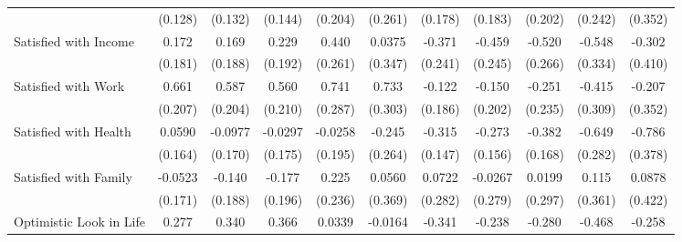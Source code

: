 {\begin{tabular}{l*{10}{c}}
            &     (0.128)         &     (0.132)         &     (0.144)         &     (0.204)         &     (0.261)         &     (0.178)         &     (0.183)         &     (0.202)         &     (0.242)         &     (0.352)         \\
\addlinespace
Satisfied with Income&       0.172         &       0.169         &       0.229         &       0.440         &      0.0375         &      -0.371         &      -0.459         &      -0.520         &      -0.548         &      -0.302         \\
            &     (0.181)         &     (0.188)         &     (0.192)         &     (0.261)         &     (0.347)         &     (0.241)         &     (0.245)         &     (0.266)         &     (0.334)         &     (0.410)         \\
\addlinespace
Satisfied with Work&       0.661\sym{**} &       0.587\sym{**} &       0.560\sym{**} &       0.741\sym{**} &       0.733\sym{*}  &      -0.122         &      -0.150         &      -0.251         &      -0.415         &      -0.207         \\
            &     (0.207)         &     (0.204)         &     (0.210)         &     (0.287)         &     (0.303)         &     (0.186)         &     (0.202)         &     (0.235)         &     (0.309)         &     (0.352)         \\
\addlinespace
Satisfied with Health&      0.0590         &     -0.0977         &     -0.0297         &     -0.0258         &      -0.245         &      -0.315\sym{*}  &      -0.273         &      -0.382\sym{*}  &      -0.649\sym{*}  &      -0.786\sym{*}  \\
            &     (0.164)         &     (0.170)         &     (0.175)         &     (0.195)         &     (0.264)         &     (0.147)         &     (0.156)         &     (0.168)         &     (0.282)         &     (0.378)         \\
\addlinespace
Satisfied with Family&     -0.0523         &      -0.140         &      -0.177         &       0.225         &      0.0560         &      0.0722         &     -0.0267         &      0.0199         &       0.115         &      0.0878         \\
            &     (0.171)         &     (0.188)         &     (0.196)         &     (0.236)         &     (0.369)         &     (0.282)         &     (0.279)         &     (0.297)         &     (0.361)         &     (0.422)         \\
\addlinespace
Optimistic Look in Life&       0.277\sym{**} &       0.340\sym{**} &       0.366\sym{**} &      0.0339         &     -0.0164         &      -0.341\sym{**} &      -0.238\sym{*}  &      -0.280\sym{*}  &      -0.468\sym{**} &      -0.258         \\

\end{tabular}}
